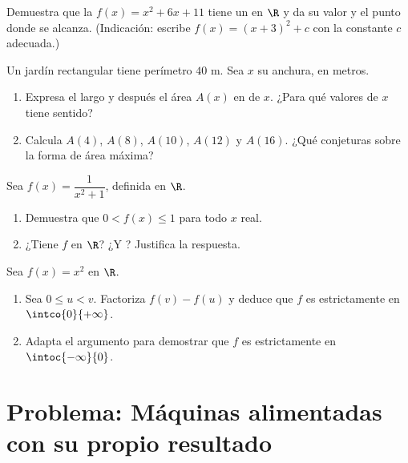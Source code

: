 \begin{exercise}[$\star\star$]\label{exo:g10:functions:7}
Demuestra que la  $f(x) = x^2 + 6x + 11$ tiene un  en $\R$ y
da su valor y el punto donde se alcanza. (Indicación: escribe
$f(x) = (x + 3)^2 + c$ con la constante $c$ adecuada.)
\end{exercise}

\begin{exercise}[$\star\star$]\label{exo:g10:functions:8}
Un jardín rectangular tiene perímetro $40$ m. Sea $x$ su anchura, en
metros.
\begin{enumerate}
  \item Expresa el largo y después el área $A(x)$ en  de $x$. ¿Para
        qué valores de $x$ tiene sentido?
  \item Calcula $A(4)$, $A(8)$, $A(10)$, $A(12)$ y $A(16)$. ¿Qué
        conjeturas sobre la forma de área máxima?
\end{enumerate}
\end{exercise}

\begin{exercise}[$\star\star$]\label{exo:g10:functions:9}
Sea $f(x) = \dfrac{1}{x^2 + 1}$, definida en $\R$.
\begin{enumerate}
  \item Demuestra que $0 < f(x) \leq 1$ para todo $x$ real.
  \item ¿Tiene $f$  en $\R$? ¿Y ? Justifica la respuesta.
\end{enumerate}
\end{exercise}

\begin{exercise}[$\star\star\star$]\label{exo:g10:functions:10}
Sea $f(x) = x^2$ en $\R$.
\begin{enumerate}
  \item Sea $0 \leq u < v$. Factoriza $f(v) - f(u)$ y deduce que $f$ es
        estrictamente  en $\intco{0}{+\infty}$.
  \item Adapta el argumento para demostrar que $f$ es estrictamente
         en $\intoc{-\infty}{0}$.
\end{enumerate}
\end{exercise}

\section{Problema: Máquinas alimentadas con su propio resultado}


